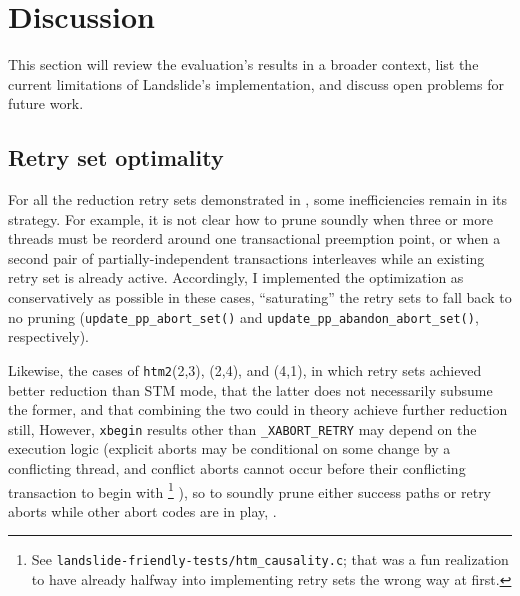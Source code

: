 


\section{Discussion}
\label{sec:tm-discussion}

This section will review %
the evaluation's results in a broader context,
list the current limitations of Landslide's implementation,
and discuss open problems for future work.

\subsection{Retry set optimality}

For all the reduction retry sets demonstrated in ,
some inefficiencies remain in its strategy.
For example, it is not clear how to prune soundly
when three or more threads must be reorderd around one transactional preemption point,
or when a second pair of partially-independent transactions interleaves while an existing retry set is already active.
Accordingly, I implemented the optimization as conservatively as possible in these cases,
``saturating'' the retry sets to fall back to no pruning
({\tt update\_pp\_abort\_set()} and
{\tt update\_pp\_abandon\_abort\_set()}, respectively).

Likewise, the cases of {\tt htm2}(2,3), (2,4), and (4,1),
in which retry sets achieved better reduction than STM mode,
 that the latter does not necessarily subsume the former,
and that combining the two could in theory achieve further reduction still,
However, {\tt xbegin} results other than {\tt \_XABORT\_RETRY}
may depend on the execution logic
(explicit aborts may be conditional on some change by a conflicting thread,
and conflict aborts cannot occur before their conflicting transaction to begin with%
\footnote{See {\tt landslide-friendly-tests/htm\_causality.c}; that was a fun realization to have
already halfway into implementing retry sets the wrong way at first.}%
),
so 
to soundly prune either success paths or retry aborts
while other abort codes are in play,
.

